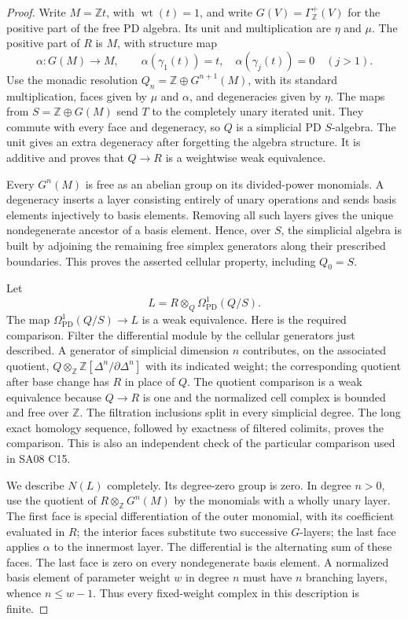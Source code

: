 \begin{proof}
Write $M=\mathbb Zt$, with $\operatorname{wt}(t)=1$, and write
$G(V)=\Gamma^+_{\mathbb Z}(V)$ for the positive part of the free
PD algebra.  Its unit and multiplication are $\eta$ and $\mu$.
The positive part of $R$ is $M$, with structure map
\[
 \alpha:G(M)\longrightarrow M,\qquad
 \alpha(\gamma_1(t))=t,\quad
 \alpha(\gamma_j(t))=0\quad(j>1).
\]
Use the monadic resolution
$Q_n=\mathbb Z\oplus G^{n+1}(M)$, with its standard multiplication,
faces given by $\mu$ and $\alpha$, and degeneracies given by
$\eta$.  The maps from $S=\mathbb Z\oplus G(M)$ send $T$ to
the completely unary iterated unit.  They commute with every
face and degeneracy, so $Q$ is a simplicial PD $S$-algebra.
The unit gives an extra degeneracy after forgetting the algebra
structure.  It is additive and proves that $Q\to R$ is a
weightwise weak equivalence.

Every $G^n(M)$ is free as an abelian group on its divided-power
monomials.  A degeneracy inserts a layer consisting entirely of
unary operations and sends basis elements injectively to basis
elements.  Removing all such layers gives the unique nondegenerate
ancestor of a basis element.  Hence, over $S$, the simplicial
algebra is built by adjoining the remaining free simplex
generators along their prescribed boundaries.  This proves
the asserted cellular property, including $Q_0=S$.

Let
\[
 L=R\otimes_Q\Omega^1_{\mathrm{PD}}(Q/S).
\]
The map $\Omega^1_{\mathrm{PD}}(Q/S)\to L$ is a weak equivalence.
Here is the required comparison.  Filter the differential module
by the cellular generators just described.  A generator of
simplicial dimension $n$ contributes, on the associated quotient,
$Q\otimes_{\mathbb Z}\mathbb Z[\Delta^n/\partial\Delta^n]$
with its indicated weight; the corresponding quotient after base
change has $R$ in place of $Q$.  The quotient comparison is a
weak equivalence because $Q\to R$ is one and the normalized cell
complex is bounded and free over $\mathbb Z$.  The filtration
inclusions split in every simplicial degree.  The long exact
homology sequence, followed by exactness of filtered colimits,
proves the comparison.  This is also an independent check of
the particular comparison used in SA08 C15.

We describe $N(L)$ completely.  Its degree-zero group is zero.
In degree $n>0$, use the quotient of
$R\otimes_{\mathbb Z}G^n(M)$ by the monomials with a wholly
unary layer.  The first face is special differentiation of the
outer monomial, with its coefficient evaluated in $R$; the
interior faces substitute two successive $G$-layers; the last
face applies $\alpha$ to the innermost layer.  The differential
is the alternating sum of these faces.  The last face is zero
on every nondegenerate basis element.  A normalized basis element
of parameter weight $w$ in degree $n$ must have $n$ branching
layers, whence $n\leq w-1$.  Thus every fixed-weight complex in
this description is finite.


\end{proof}
